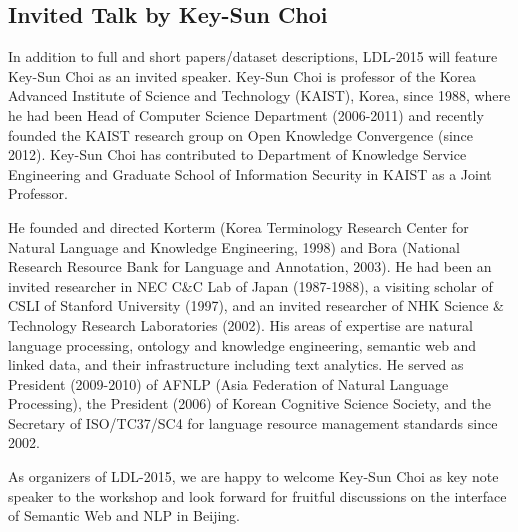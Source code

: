 \subsection{Invited Talk by Key-Sun Choi}

In addition to full and short papers/dataset descriptions, LDL-2015 will feature Key-Sun Choi as an invited speaker. Key-Sun Choi is professor of the Korea Advanced Institute of Science and Technology (KAIST), Korea, since 1988, where he had been Head of Computer Science Department (2006-2011) and recently founded the KAIST research group on Open Knowledge Convergence (since 2012). Key-Sun Choi has contributed to Department of Knowledge Service Engineering and Graduate School of Information Security in KAIST as a Joint Professor.

He founded and directed Korterm (Korea Terminology Research Center for Natural Language and Knowledge Engineering, 1998) and Bora (National Research Resource Bank for Language and Annotation, 2003). He had been an invited researcher in NEC C\&C Lab of Japan (1987-1988), a visiting scholar of CSLI of Stanford University (1997), and an invited researcher of NHK Science \& Technology Research Laboratories (2002). His areas of expertise are natural language processing, ontology and knowledge engineering, semantic web and linked data, and their infrastructure including text analytics. He served as President (2009-2010) of AFNLP (Asia Federation of Natural Language Processing), the President (2006) of Korean Cognitive Science Society, and the Secretary of ISO/TC37/SC4 for language resource management standards since 2002. 

As organizers of LDL-2015, we are happy to welcome Key-Sun Choi as key note speaker to the workshop and look forward for fruitful discussions on the interface of Semantic Web and NLP in Beijing.

